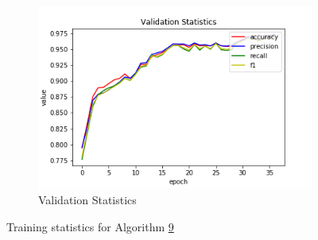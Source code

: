 \begin{figure}[h!]
\begin{subfigure}[b]{0.35\linewidth}
    \includegraphics[width=\linewidth]{images/cae_online_lstm/caelstm_section_lstm_training_uniform_random_fill_10000_block_map_10000_model_validation_stats.png}
     \caption{Validation Statistics}
  \end{subfigure}
  \caption{Training statistics for Algorithm \hyperref[tab: app_evalalgorithms]{9}}
  \label{fig: train_olnine_lstm_9}
\end{figure}

